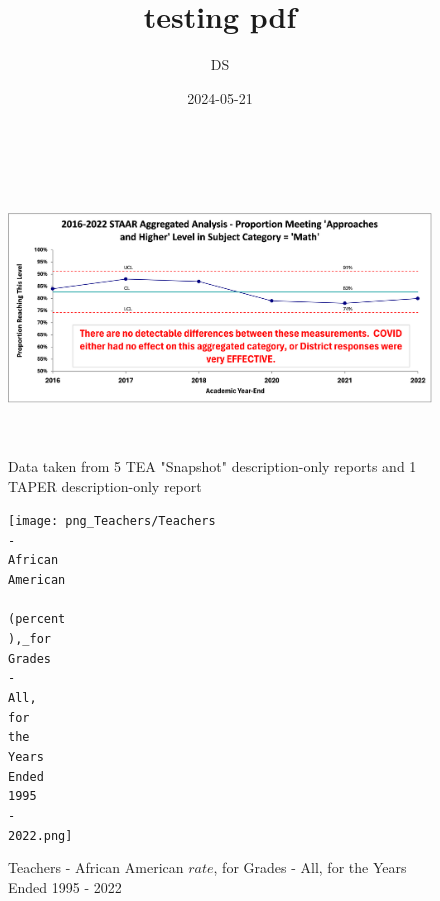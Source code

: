 \documentclass[
  18pt,
]{article}
\title{testing pdf}
\author{DS}
\date{2024-05-21}
\begin{document}
\maketitle

{
\setcounter{tocdepth}{2}
\tableofcontents
}
\begin{figure}[ht]  
  \centering
  \includegraphics[width = 1.0\textwidth, height = 3.0in]{pbc/xmr-2016-2022-math-approaches-combo.png}
  \caption{Data taken from 5 TEA "Snapshot" description-only reports and 1 TAPER description-only report}
\end{figure}

\medskip

\begin{figure}[ht]
  \centering
    \texttt{[image: png\_Teachers/Teachers\\ -\\ African\\ American\\  \\(percent\\),\_for\\ Grades\\ -\\ All,\\ for\\ the\\ Years\\ Ended\\ 1995\\  -\\  2022.png]}
  \caption{Teachers - African American \(rate\), for Grades - All, for the Years Ended 1995 - 2022}
\end{figure}
\end{document}
